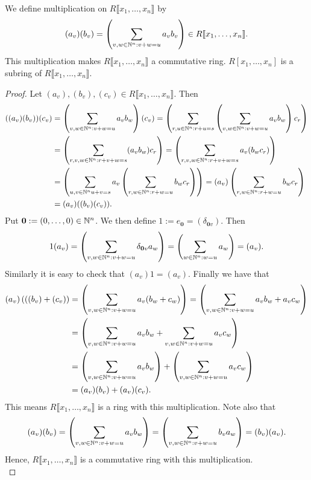 \begin{lemma}
    We define multiplication on $R\llbracket x_1,\dots,x_n \rrbracket$ by
    $$(a_v)(b_v)=\left( \sum_{v,w\in \mathbb{N}^n : v+w =u} a_vb_v \right)\in R\llbracket x_1,\dots,x_n \rrbracket.$$
    This multiplication makes $R\llbracket x_1,\dots,x_n \rrbracket$ a commutative ring. $R\left[x_1,\dots,x_n\right]$ is a subring of $R\llbracket x_1,\dots,x_n \rrbracket$.  
\end{lemma}
\begin{proof}
    Let $(a_v),(b_v),(c_v)\in R\llbracket x_1,\dots,x_n \rrbracket$. Then 
    \begin{align*}
        ((a_v)(b_v))(c_v)&=\left(\sum_{v,w\in \mathbb{N}^n : v+w= u} a_vb_w\right)(c_v) =\left( \sum_{r,u\in \mathbb{N}^n : r+u=s} \left(\sum_{v,w\in \mathbb{N}^n : v+w = u} a_vb_w \right)c_r\right)\\
        &= \left( \sum_{r,v,w\in \mathbb{N}^n : r+v+w = s} (a_vb_w)c_r\right) = \left( \sum_{r,v,w\in \mathbb{N}^n : r+v+w = s} a_v(b_wc_r)\right)\\
        &= \left(\sum_{u,v\in \mathbb{N}^n u+v = s} a_v\left(\sum_{r,w\in \mathbb{N}^n : r+w =  u} b_wc_r \right)\right) = (a_v)\left(\sum_{r,w\in \mathbb{N}^n : r+w = u} b_wc_r \right)\\
        &= (a_v)((b_v)(c_v)). 
    \end{align*}
    Put $\mathbf{0}:= (0,\dots,0)\in \mathbb{N}^n$. We then define $1 := e_\mathbf{0} = (\delta_{\mathbf{0}v})$. Then 
    $$1(a_v) = \left(\sum_{v,w\in \mathbb{N}^n : v+w = u} \delta_{\mathbf{0}v} a_w \right) = \left(\sum_{w\in \mathbb{N}^n : w = u}  a_w \right) = (a_v).$$
    Similarly it is easy to check that $(a_v)1 = (a_v)$. Finally we have that 
    \begin{align*}
        (a_v)\left(((b_v)+(c_v)\right) &= \left(\sum_{v,w\in \mathbb{N}^n : v+w = u} a_v(b_w + c_w) \right) = \left(\sum_{v,w\in \mathbb{N}^n : v+w = u} a_vb_w + a_vc_w \right)\\ 
        &= \left(\sum_{v,w\in \mathbb{N}^n : v+w = u} a_vb_w + \sum_{v,w\in \mathbb{N}^n : v+w = u}a_vc_w \right)\\
        &= \left(\sum_{v,w\in \mathbb{N}^n : v+w = u} a_vb_w\right) + \left(\sum_{v,w\in \mathbb{N}^n : v+w = u}a_vc_w \right)\\ &= (a_v)(b_v)+(a_v)(c_v).
    \end{align*}
    This means $R\llbracket x_1,\dots,x_n \rrbracket$ is a ring with this multiplication. Note also that
    $$(a_v)(b_v) = \left( \sum_{v,w\in \mathbb{N}^n : v+w =u} a_vb_w \right) =\left( \sum_{v,w\in \mathbb{N}^n : v+w =u} b_va_w \right)=(b_v)(a_v).$$
    Hence, $R\llbracket x_1,\dots,x_n \rrbracket$ is a commutative ring with this multiplication.\\

\end{proof}
